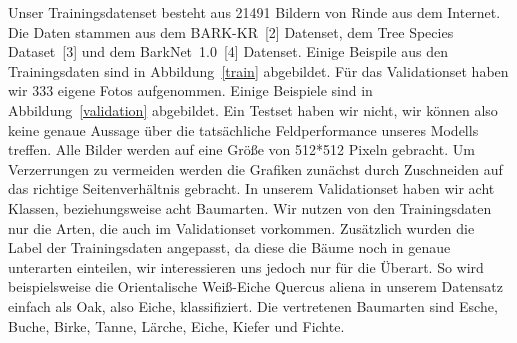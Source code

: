 \documentclass{article}
\begin{document}
Unser Trainingsdatenset besteht aus 21491 Bildern von Rinde aus dem Internet. Die Daten stammen aus dem BARK-KR~[2] Datenset, dem Tree Species Dataset~[3] und dem BarkNet~1.0~[4] Datenset. Einige Beispile aus den Trainingsdaten sind in Abbildung~\ref{train} abgebildet. Für das Validationset haben wir 333 eigene Fotos aufgenommen. Einige Beispiele sind in Abbildung~\ref{validation} abgebildet. Ein Testset haben wir nicht, wir können also keine genaue Aussage über die tatsächliche Feldperformance unseres Modells treffen. Alle Bilder werden auf eine Grö\ss e von 512*512 Pixeln gebracht. Um Verzerrungen zu vermeiden werden die Grafiken zunächst durch Zuschneiden auf das richtige Seitenverhältnis gebracht. In unserem Validationset haben wir acht Klassen, beziehungsweise acht Baumarten. Wir nutzen von den Trainingsdaten nur die Arten, die auch im Validationset vorkommen. Zusätzlich wurden die Label der Trainingsdaten angepasst, da diese die Bäume noch in genaue unterarten einteilen, wir interessieren uns jedoch nur für die Überart. So wird beispielsweise die Orientalische Wei\ss -Eiche Quercus aliena in unserem Datensatz einfach als Oak, also Eiche, klassifiziert. Die vertretenen Baumarten sind Esche, Buche, Birke, Tanne, Lärche, Eiche, Kiefer und Fichte.
\end{document}
